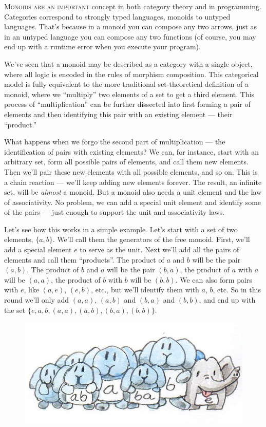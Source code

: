 \lettrine[lhang=0.17]{M}{onoids are an important} concept in both category theory and in
programming. Categories correspond to strongly typed languages, monoids
to untyped languages. That's because in a monoid you can compose any two
arrows, just as in an untyped language you can compose any two functions
(of course, you may end up with a runtime error when you execute your
program).

We've seen that a monoid may be described as a category with a single
object, where all logic is encoded in the rules of morphism composition.
This categorical model is fully equivalent to the more traditional
set-theoretical definition of a monoid, where we ``multiply'' two
elements of a set to get a third element. This process of
``multiplication'' can be further dissected into first forming a pair of
elements and then identifying this pair with an existing element ---
their ``product.''

What happens when we forgo the second part of multiplication --- the
identification of pairs with existing elements? We can, for instance,
start with an arbitrary set, form all possible pairs of elements, and
call them new elements. Then we'll pair these new elements with all
possible elements, and so on. This is a chain reaction --- we'll keep
adding new elements forever. The result, an infinite set, will be
\emph{almost} a monoid. But a monoid also needs a unit element and the
law of associativity. No problem, we can add a special unit element and
identify some of the pairs --- just enough to support the unit and
associativity laws.

Let's see how this works in a simple example. Let's start with a set of
two elements, $\{a, b\}$. We'll call them the generators of the
free monoid. First, we'll add a special element $e$ to serve as
the unit. Next we'll add all the pairs of elements and call them
``products''. The product of $a$ and $b$ will be the pair
$(a, b)$. The product of $b$ and $a$ will be the
pair $(b, a)$, the product of $a$ with $a$ will be
$(a, a)$, the product of $b$ with $b$ will be
$(b, b)$. We can also form pairs with $e$, like
$(a, e)$, $(e, b)$, etc., but we'll identify them with
$a$, $b$, etc. So in this round we'll only add
$(a, a)$, $(a, b)$ and $(b, a)$ and
$(b, b)$, and end up with the set
$\{e, a, b, (a, a), (a, b), (b, a), (b, b)\}$.

\begin{figure}[H]
\centering
\includegraphics[width=\textwidth]{images/bunnies.jpg}
\end{figure}

